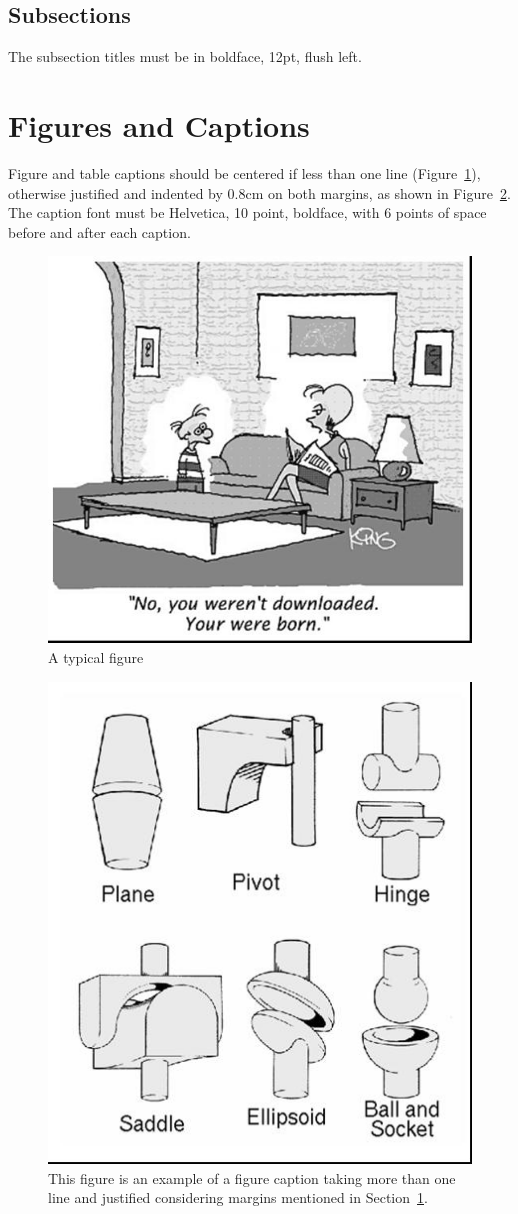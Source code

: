 \documentclass[12pt]{article}
\begin{document}
\subsection{Subsections}

The subsection titles must be in boldface, 12pt, flush left.

\section{Figures and Captions}\label{sec:figs}


Figure and table captions should be centered if less than one line
(Figure~\ref{fig:exampleFig1}), otherwise justified and indented by 0.8cm on
both margins, as shown in Figure~\ref{fig:exampleFig2}. The caption font must
be Helvetica, 10 point, boldface, with 6 points of space before and after each
caption.

\begin{figure}[ht]
\centering
\includegraphics[width=.5\textwidth]{fig1.jpg}
\caption{A typical figure}
\label{fig:exampleFig1}
\end{figure}

\begin{figure}[ht]
\centering
\includegraphics[width=.3\textwidth]{fig2.jpg}
\caption{This figure is an example of a figure caption taking more than one
  line and justified considering margins mentioned in Section~\ref{sec:figs}.}
\label{fig:exampleFig2}
\end{figure}
\end{document}
